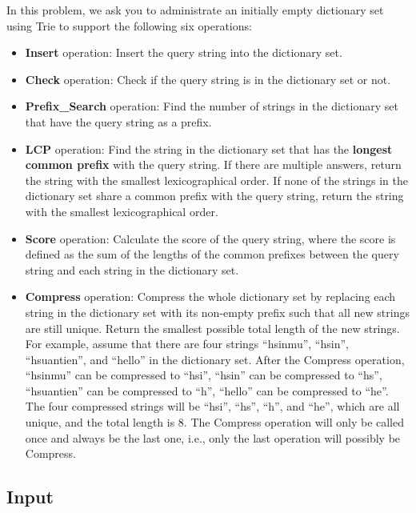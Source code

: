 In this problem, we ask you to administrate an initially empty dictionary set using Trie to support the following six operations:
\begin{itemize}
    \item \textbf{Insert} operation: Insert the query string into the dictionary set.
    \item \textbf{Check} operation: Check if the query string is in the dictionary set or not.
    \item \textbf{Prefix\_Search} operation: Find the number of strings in the dictionary set that have the query string as a prefix.
    \item \textbf{LCP} operation: Find the string in the dictionary set that has the \textbf{longest common prefix} with the query string. If there are multiple answers, return the string with the smallest lexicographical order. If none of the strings in the dictionary set share a common prefix with the query string, return the string with the smallest lexicographical order.
    \item \textbf{Score} operation: Calculate the score of the query string, where the score is defined as the sum of the lengths of the common prefixes between the query string and each string in the dictionary set.
    \item \textbf{Compress} operation: Compress the whole dictionary set by replacing each string in the dictionary set with its non-empty prefix such that all new strings are still unique. Return the smallest possible total length of the new strings. For example, assume that there are four strings ``hsinmu'', ``hsin'', ``hsuantien'', and ``hello'' in the dictionary set. After the Compress operation, ``hsinmu'' can be compressed to ``hsi'', ``hsin'' can be compressed to ``hs'', ``hsuantien'' can be compressed to ``h'', ``hello'' can be compressed to ``he''. The four compressed strings will be ``hsi'', ``hs'', ``h'', and ``he'', which are all unique, and the total length is 8. The Compress operation will only be called once and always be the last one, i.e., only the last operation will possibly be Compress.

\end{itemize}

\subsection{Input}\label{input}

